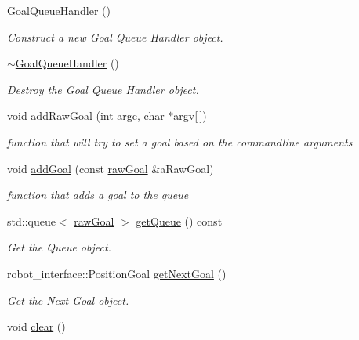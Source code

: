 \begin{DoxyCompactItemize}
\item 
\hyperlink{classMotionPlanner_1_1GoalQueueHandler_a74cbd86f98f2f0b236213041b1e6f32b}{Goal\+Queue\+Handler} ()\hypertarget{classMotionPlanner_1_1GoalQueueHandler_a74cbd86f98f2f0b236213041b1e6f32b}{}\label{classMotionPlanner_1_1GoalQueueHandler_a74cbd86f98f2f0b236213041b1e6f32b}

\begin{DoxyCompactList}\small\item\em Construct a new Goal Queue Handler object. \end{DoxyCompactList}\item 
\hyperlink{classMotionPlanner_1_1GoalQueueHandler_a9aad546d5899b57dd4f08d5ae20125f1}{$\sim$\+Goal\+Queue\+Handler} ()\hypertarget{classMotionPlanner_1_1GoalQueueHandler_a9aad546d5899b57dd4f08d5ae20125f1}{}\label{classMotionPlanner_1_1GoalQueueHandler_a9aad546d5899b57dd4f08d5ae20125f1}

\begin{DoxyCompactList}\small\item\em Destroy the Goal Queue Handler object. \end{DoxyCompactList}\item 
void \hyperlink{classMotionPlanner_1_1GoalQueueHandler_aac7538d38c2f327c563cb0e962a18ece}{add\+Raw\+Goal} (int argc, char $\ast$argv\mbox{[}$\,$\mbox{]})
\begin{DoxyCompactList}\small\item\em function that will try to set a goal based on the commandline arguments \end{DoxyCompactList}\item 
void \hyperlink{classMotionPlanner_1_1GoalQueueHandler_a4f08a02fca360c8010f9d324784acf28}{add\+Goal} (const \hyperlink{structMotionPlanner_1_1rawGoal}{raw\+Goal} \&a\+Raw\+Goal)
\begin{DoxyCompactList}\small\item\em function that adds a goal to the queue \end{DoxyCompactList}\item 
std\+::queue$<$ \hyperlink{structMotionPlanner_1_1rawGoal}{raw\+Goal} $>$ \hyperlink{classMotionPlanner_1_1GoalQueueHandler_a6ee31f36ec20b2e9b16d14ee9af06cfe}{get\+Queue} () const 
\begin{DoxyCompactList}\small\item\em Get the Queue object. \end{DoxyCompactList}\item 
robot\+\_\+interface\+::\+Position\+Goal \hyperlink{classMotionPlanner_1_1GoalQueueHandler_a8f82872be4c475e58b061fc96b525fc6}{get\+Next\+Goal} ()
\begin{DoxyCompactList}\small\item\em Get the Next Goal object. \end{DoxyCompactList}\item 
void \hyperlink{classMotionPlanner_1_1GoalQueueHandler_a249e898b831fe6619f607f77cacdfd5d}{clear} ()\hypertarget{classMotionPlanner_1_1GoalQueueHandler_a249e898b831fe6619f607f77cacdfd5d}{}\label{classMotionPlanner_1_1GoalQueueHandler_a249e898b831fe6619f607f77cacdfd5d}


\end{DoxyCompactItemize}
